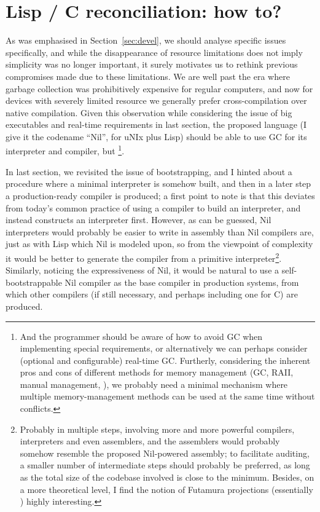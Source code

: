 \section{Lisp / C reconciliation: how to?}\label{sec:howto}

As was emphasised in Section~\ref{sec:devel}, we should analyse specific issues
specifically, and while the disappearance of resource limitations does not imply
simplicity was no longer important, it surely motivates us to rethink previous
compromises made due to these limitations.  We are well past the era where
garbage collection was prohibitively expensive for regular computers, and now
for devices with severely limited resource we generally prefer cross-compilation
over native compilation.  Given this observation while considering the issue
of big executables and real-time requirements in last section, the proposed
language (I give it the codename ``Nil'', for uNIx plus Lisp) should be able
to use GC for its interpreter and compiler, but \footnote%
{And the programmer should be aware of how to avoid GC when implementing
special requirements, or alternatively we can perhaps consider (optional and
configurable) real-time GC.  Furtherly, considering
the inherent pros and cons of different methods for memory management (GC, RAII,
manual management, \etc), we probably need a minimal mechanism where multiple
memory-management methods can be used at the same time without conflicts.}.

In last section, we revisited the issue of bootstrapping, and I hinted about
a procedure where a minimal interpreter is somehow built, and then in a later
step a production-ready compiler is produced; a first point to note is that
this deviates from today's common practice of using a compiler to build an
interpreter, and instead constructs an interpreter first.  However, as can be
guessed, Nil interpreters would probably be easier to write in assembly than
Nil compilers are, just as with Lisp which Nil is modeled upon, so from the
viewpoint of complexity it would be better to generate the compiler from a
primitive interpreter\footnote{Probably in multiple steps, involving more and
more powerful compilers, interpreters and even assemblers, and the assemblers
would probably somehow resemble the proposed Nil-powered assembly; to facilitate
auditing, a smaller number of intermediate steps should probably be preferred,
as long as the total size of the codebase involved is close to the minimum.
Besides, on a more theoretical level, I find the notion of Futamura projections
(essentially ) highly
interesting.}.  Similarly, noticing the expressiveness of Nil, it would
be natural to use a self-bootstrappable Nil compiler as the base
compiler in production systems, from which other compilers (if
still necessary, and perhaps including one for C) are produced.

